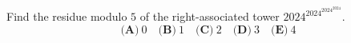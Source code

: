 Find the residue modulo $5$ of the right-associated tower $2024^{2024^{2024^{2024}}}$.
\[\textbf{(A)}~0\quad\textbf{(B)}~1\quad\textbf{(C)}~2\quad\textbf{(D)}~3\quad\textbf{(E)}~4\]
